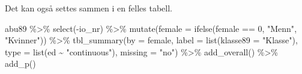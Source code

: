 \documentclass[
  norsk,
  letterpaper,
  DIV=11,
  numbers=noendperiod]{scrreprt}
\newenvironment{Shaded}{\begin{snugshade}}{\end{snugshade}}
\newcommand{\AttributeTok}[1]{\textcolor[rgb]{0.40,0.45,0.13}{#1}}
\newcommand{\DecValTok}[1]{\textcolor[rgb]{0.68,0.00,0.00}{#1}}
\newcommand{\FunctionTok}[1]{\textcolor[rgb]{0.28,0.35,0.67}{#1}}
\newcommand{\NormalTok}[1]{\textcolor[rgb]{0.00,0.23,0.31}{#1}}
\newcommand{\SpecialCharTok}[1]{\textcolor[rgb]{0.37,0.37,0.37}{#1}}
\newcommand{\StringTok}[1]{\textcolor[rgb]{0.13,0.47,0.30}{#1}}
\theoremstyle{definition}
\theoremstyle{remark}
\begin{document}
Det kan også settes sammen i en felles tabell.

\begin{Shaded}
\begin{Highlighting}[]
\NormalTok{abu89 }\SpecialCharTok{\%\textgreater{}\%} 
  \FunctionTok{select}\NormalTok{(}\SpecialCharTok{{-}}\NormalTok{io\_nr) }\SpecialCharTok{\%\textgreater{}\%}
  \FunctionTok{mutate}\NormalTok{(}\AttributeTok{female =} \FunctionTok{ifelse}\NormalTok{(female }\SpecialCharTok{==} \DecValTok{0}\NormalTok{, }\StringTok{"Menn"}\NormalTok{, }\StringTok{"Kvinner"}\NormalTok{)) }\SpecialCharTok{\%\textgreater{}\%} 
    \FunctionTok{tbl\_summary}\NormalTok{(}\AttributeTok{by =}\NormalTok{ female, }
                \AttributeTok{label =} \FunctionTok{list}\NormalTok{(}\AttributeTok{klasse89 =} \StringTok{"Klasse"}\NormalTok{), }
              \AttributeTok{type =} \FunctionTok{list}\NormalTok{(ed }\SpecialCharTok{\textasciitilde{}} \StringTok{"continuous"}\NormalTok{), }
              \AttributeTok{missing =} \StringTok{"no"}\NormalTok{) }\SpecialCharTok{\%\textgreater{}\%} 
  \FunctionTok{add\_overall}\NormalTok{() }\SpecialCharTok{\%\textgreater{}\%} 
  \FunctionTok{add\_p}\NormalTok{() }
\end{Highlighting}
\end{Shaded}
\end{document}
